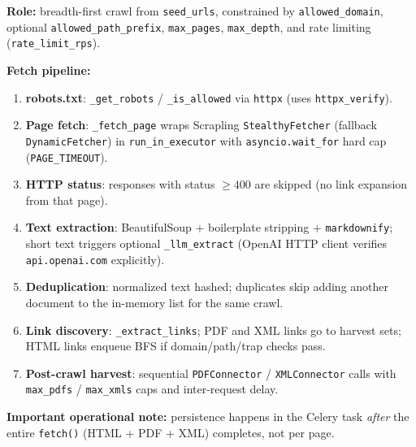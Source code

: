 \documentclass[11pt,a4paper]{article}
\begin{document}
\textbf{Role:} breadth-first crawl from \texttt{seed\_urls}, constrained by
\texttt{allowed\_domain}, optional \texttt{allowed\_path\_prefix}, \texttt{max\_pages},
\texttt{max\_depth}, and rate limiting (\texttt{rate\_limit\_rps}).

\textbf{Fetch pipeline:}
\begin{enumerate}
  \item \textbf{robots.txt}: \texttt{\_get\_robots} / \texttt{\_is\_allowed} via \texttt{httpx} (uses \texttt{httpx\_verify}).
  \item \textbf{Page fetch}: \texttt{\_fetch\_page} wraps Scrapling \texttt{StealthyFetcher} (fallback \texttt{DynamicFetcher}) in \texttt{run\_in\_executor} with \texttt{asyncio.wait\_for} hard cap (\texttt{PAGE\_TIMEOUT}).
  \item \textbf{HTTP status}: responses with status $\geq 400$ are skipped (no link expansion from that page).
  \item \textbf{Text extraction}: BeautifulSoup + boilerplate stripping + \texttt{markdownify}; short text triggers optional \texttt{\_llm\_extract} (OpenAI HTTP client verifies \texttt{api.openai.com} explicitly).
  \item \textbf{Deduplication}: normalized text hashed; duplicates skip adding another document to the in-memory list for the same crawl.
  \item \textbf{Link discovery}: \texttt{\_extract\_links}; PDF and XML links go to harvest sets; HTML links enqueue BFS if domain/path/trap checks pass.
  \item \textbf{Post-crawl harvest}: sequential \texttt{PDFConnector} / \texttt{XMLConnector} calls with \texttt{max\_pdfs} / \texttt{max\_xmls} caps and inter-request delay.
\end{enumerate}

\textbf{Important operational note:} persistence happens in the Celery task
\textit{after} the entire \texttt{fetch()} (HTML + PDF + XML) completes, not per page.
\end{document}
